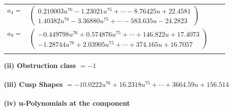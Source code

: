 \documentclass[1p]{elsarticle_modified}
\theoremstyle{definition}
\begin{document}
\begin{tabular}{m{7pt} m{180pt} m{7pt} m{180pt} }
\flushright $a_{4}=$&$\begin{pmatrix}0.210003 u^{76}-1.23021 u^{75}+\cdots-8.76425 u+22.4581\\1.40382 u^{76}-3.36880 u^{75}+\cdots-583.635 u-24.2823\end{pmatrix}$ \\
\flushright $a_{9}=$&$\begin{pmatrix}-0.449798 u^{76}+0.574876 u^{75}+\cdots+146.822 u+17.4073\\-1.28744 u^{76}+2.03905 u^{75}+\cdots+374.165 u+16.7057\end{pmatrix}$\\&\end{tabular}
\flushleft \textbf{(ii) Obstruction class $= -1$}\\~\\
\flushleft \textbf{(iii) Cusp Shapes $= -10.0222 u^{76}+16.2318 u^{75}+\cdots+3664.59 u+156.514$}\\~\\
\newpage\renewcommand{\arraystretch}{1}
\flushleft \textbf{(iv) u-Polynomials at the component}\newline \\
\end{document}
